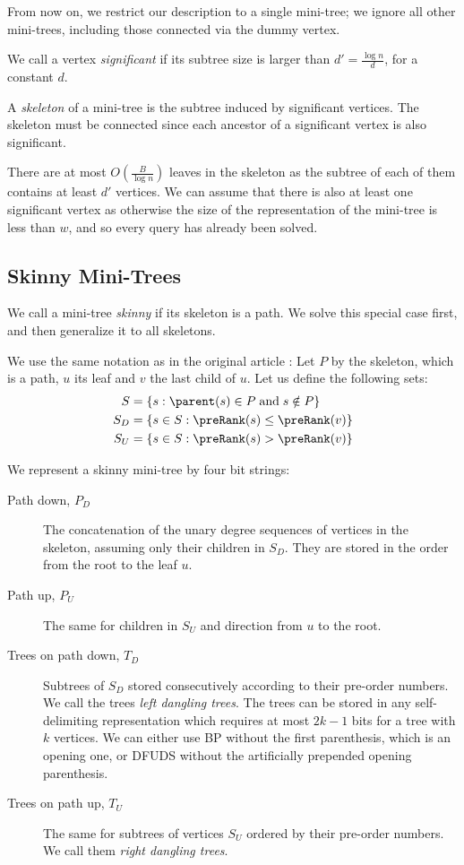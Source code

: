 \bigbreak

From now on, we restrict our description to a single mini-tree; we ignore all other mini-trees, including those connected via the dummy vertex.

We call a vertex \emph{significant} if its subtree size is larger than $d' = \frac{\log n}{d}$, for a constant $d$.

A \emph{skeleton} of a mini-tree is the subtree induced by significant vertices.
The skeleton must be connected since each ancestor of a significant vertex is also significant.

There are at most $O\left(\frac{B}{\log n}\right)$ leaves in the skeleton as the subtree of each of them contains at least $d'$ vertices.
We can assume that there is also at least one significant vertex as otherwise the size of the representation of the mini-tree is less than $w$, and so every query has already been solved.

\subsection{Skinny Mini-Trees}

We call a mini-tree \emph{skinny} if its skeleton is a path.
We solve this special case first, and then generalize it to all skeletons.

We use the same notation as in the original article \cite{farzan2009universal}:
Let $P$ by the skeleton, which is a path, $u$ its leaf and $v$ the last child of $u$.
Let us define the following sets:
\begin{align*}
	S &= \{ s : \parent(s) \in P \booland s \notin P \} \\
	S_D &= \{ s \in S : \preRank(s) \le \preRank(v) \} \\
	S_U &= \{ s \in S : \preRank(s) > \preRank(v) \}
\end{align*}

We represent a skinny mini-tree by four bit strings:
\begin{description}
	\item[Path down, $P_D$]
	The concatenation of the unary degree sequences of vertices in the skeleton, assuming only their children in $S_D$.
	They are stored in the order from the root to the leaf $u$.
	
	\item[Path up, $P_U$]
	The same for children in $S_U$ and direction from $u$ to the root.
	
	\item[Trees on path down, $T_D$]
	Subtrees of $S_D$ stored consecutively according to their pre-order numbers.
	We call the trees \emph{left dangling trees}.
	The trees can be stored in any self-delimiting representation which requires at most $2k - 1$ bits for a tree with $k$ vertices.
	We can either use BP without the first parenthesis, which is an opening one, or DFUDS without the artificially prepended opening parenthesis.
	
	\item[Trees on path up, $T_U$]
	The same for subtrees of vertices $S_U$ ordered by their pre-order numbers.
	We call them \emph{right dangling trees}.
\end{description}


